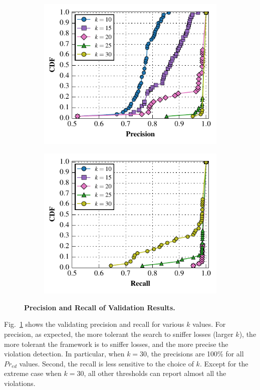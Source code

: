 \begin{figure}
  \vspace*{-5mm}
  \centering
  \begin{subfigure}{0.48\textwidth}
    \includegraphics[width=\textwidth]{./figures/scripts/PrecisionFigure.pdf}
  \end{subfigure}
  \begin{subfigure}{0.48\textwidth}
    \includegraphics[width=\textwidth]{./figures/scripts/RecallFigure.pdf}
  \end{subfigure}
  \caption{\textbf{Precision and Recall of Validation Results.}}
  \label{fig:precision}
  \vspace*{-5mm}
\end{figure}

Fig.~\ref{fig:precision} shows the validating precision and recall for various
$k$ values. For precision, as expected, the more tolerant the search to sniffer
losses (larger $k$), the more tolerant the framework is to sniffer losses, and
the more precise the violation detection. In particular, when $k=30$, the
precisions are 100\% for all $Pr_{ed}$ values. Second, the recall is less
sensitive to the choice of $k$.  Except for the extreme case when $k=30$, all
other thresholds can report almost all the violations.
